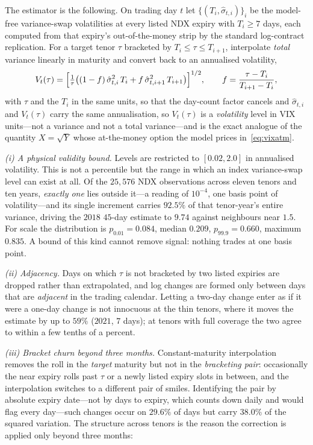 \documentclass[11pt]{article}
\providecommand{\1}{\mathbf 1}
\begin{document}
The estimator is the following. On trading day $t$ let $\{(T_i,\hat\sigma_{t,i})\}_i$ be the model-free
variance-swap volatilities at every listed NDX expiry with $T_i\ge7$ days, each computed from that
expiry's out-of-the-money strip by the standard log-contract replication. For a target tenor $\tau$
bracketed by $T_i\le\tau\le T_{i+1}$, interpolate \emph{total} variance linearly in maturity and
convert back to an annualised volatility,
\begin{equation}\label{eq:cmt}
  V_t(\tau)=\Bigl[\tfrac{1}{\tau}\bigl((1-f)\,\hat\sigma_{t,i}^2\,T_i
  +f\,\hat\sigma_{t,i+1}^2\,T_{i+1}\bigr)\Bigr]^{1/2},
  \qquad f=\frac{\tau-T_i}{T_{i+1}-T_i},
\end{equation}
with $\tau$ and the $T_i$ in the same units, so that the day-count factor cancels and
$\hat\sigma_{t,i}$ and $V_t(\tau)$ carry the same annualisation,
so $V_t(\tau)$ is a \emph{volatility} level in VIX units---not a variance and not a total
variance---and is the exact analogue of the quantity $X=\sqrt{Y}$ whose at-the-money option the model
prices in~\eqref{eq:vixatm}.

\emph{(i) A physical validity bound.} Levels are restricted to $[0.02,2.0]$ in annualised volatility.
This is not a percentile but the range in which an index variance-swap level can exist at all. Of the
$25{,}576$ NDX observations across eleven tenors and ten years, \emph{exactly one} lies outside it---a
reading of $10^{-4}$, one basis point of volatility---and its single increment carries $92.5\%$ of
that tenor-year's entire variance, driving the $2018$ $45$-day estimate to $9.74$ against neighbours
near $1.5$. For scale the distribution is $p_{0.01}=0.084$, median $0.209$, $p_{99.9}=0.660$,
maximum $0.835$. A bound of this kind cannot remove signal: nothing trades at one basis point.

\emph{(ii) Adjacency.} Days on which $\tau$ is not bracketed by two listed expiries are dropped rather
than extrapolated, and log changes are formed only between days that are \emph{adjacent} in the
trading calendar. Letting a two-day change enter as if it were a one-day change is not innocuous at
the thin tenors, where it moves the estimate by up to $59\%$ ($2021$, $7$ days); at tenors with full
coverage the two agree to within a few tenths of a percent.

\emph{(iii) Bracket churn beyond three months.} Constant-maturity interpolation removes the roll in
the \emph{target} maturity but not in the \emph{bracketing pair}: occasionally the near expiry rolls
past $\tau$ or a newly listed expiry slots in between, and the interpolation switches to a different
pair of smiles. Identifying the pair by absolute expiry date---not by days to expiry, which counts
down daily and would flag every day---such changes occur on $29.6\%$ of days but carry $38.0\%$ of
the squared variation. The structure across tenors is the reason the correction is applied only
beyond three months:
\end{document}
